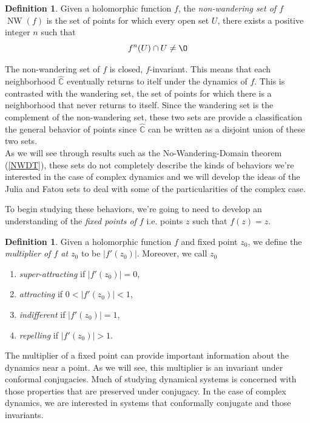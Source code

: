 \documentclass{amsart}
\newcommand{\bbC}{\mathbb{C}}
\newcommand{\bbCS}{\hat{\bbC}}
\newcommand{\NW}{\operatorname{NW}}
\newcommand{\abs}[1]{ \left| #1 \right| }
\renewcommand{\emptyset}{\O}
\theoremstyle{definition}
\newtheorem{defn}[thm]{Definition}
\theoremstyle{remark}
\numberwithin{equation}{section}
\begin{document}
\begin{defn}
  Given a holomorphic function $f$, the \emph{non-wandering set of $f$} $\NW(f)$ is the set of points for which every open set $U$, there exists a positive integer $n$ such that \[
f^n(U)\cap U\neq\emptyset
  \]
\end{defn}
The non-wandering set of $f$ is closed, $f$-invariant. This means that each neighborhood $\bbCS$ eventually returns to itelf under the dynamics of $f$. This is contrasted with the wandering set, the set of points for which there is a neighborhood that never returns to itself. Since the wandering set is the complement of the non-wandering set, these two sets are provide a classification the general behavior of points since $\bbCS$ can be written as a disjoint union of these two sets.\\

As we will see through results such as the No-Wandering-Domain theorem (\cref{NWDT}), these sets do not completely describe the kinds of behaviors we're interested in the case of complex dynamics and we will develop the ideas of the Julia and Fatou sets to deal with some of the particularities of the complex case.


To begin studying these behaviors, we're going to need to develop an understanding of the \emph{fixed points of $f$} i.e. points $z$ such that $f(z)=z$.

\begin{defn}\label{multiplier}
Given a holomorphic function $f$ and fixed point $z_0$, we define the \emph{multiplier of $f$ at $z_0$} to be $\abs{f'(z_0)}$. Moreover, we call $z_0$
\begin{enumerate}
  \item \emph{super-attracting} if $\abs{f'(z_0)}=0$,
  \item \emph{attracting} if $0<\abs{f'(z_0)}<1$,
  \item \emph{indifferent} if $\abs{f'(z_0)}=1$,
  \item \emph{repelling} if $\abs{f'(z_0)}>1$.
\end{enumerate}
\end{defn}

The multiplier of a fixed point can provide important information about the dynamics near a point. As we will see, this multiplier is an invariant under conformal conjugacies. Much of studying dynamical systems is concerned with those properties that are preserved under conjugacy. In the case of complex dynamics, we are interested in systems that conformally conjugate and those invariants.
\end{document}

